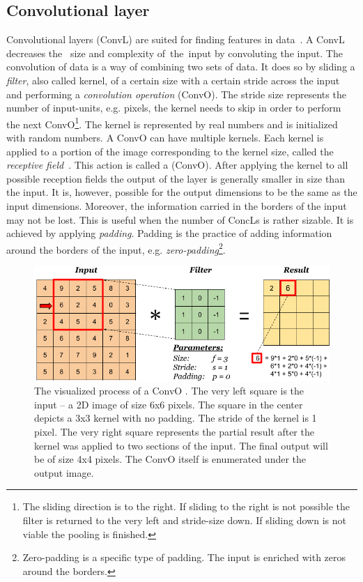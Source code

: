\subsection{Convolutional layer}\label{convolutionalLayers}
Convolutional layers (ConvL) are suited for finding features in data~\cite{CNN}. A ConvL decreases the~ size and complexity of~the~input by convoluting the input. The convolution of data is a way of combining two sets of data.  It does so by sliding a \textit{filter}, also called kernel, of a certain size with a certain stride across the input and performing a \textit{convolution operation} (ConvO). The stride size represents the number of input-units, e.g. pixels, the kernel needs to skip in order to perform the next ConvO\footnote{The sliding direction is to the right. If sliding to the right is not possible the filter is returned to the very left and stride-size down. If sliding down is not viable the pooling is finished.}. The kernel is represented by real numbers and is initialized with random numbers. A ConvO can have multiple kernels. Each kernel is applied to a portion of the image corresponding to the kernel size, called the \textit{receptive field}~\cite{receptiveField}. This action is called a (ConvO). After applying the kernel to all possible reception fields the output of the layer is generally smaller in size than the input. It is, however, possible for the output dimensions to be the same as the input dimensions. Moreover, the information carried in the borders of the input may not be lost. This is useful when the number of ConcLs is rather sizable. It is achieved by applying \textit{padding}. Padding is the practice of adding information around the borders of the input, e.g. \textit{zero-padding}\footnote{Zero-padding is a specific type of padding. The input is enriched with zeros around the borders.}.
\begin{figure}[ht!]
  \centering
  \includegraphics[width=\textwidth]{Images/convolution-operation.png}
  \caption{The visualized process of a ConvO \cite{convolutionOperationVisualization}. The very left square is the input -- a 2D image of size 6x6 pixels. The square in the center depicts a 3x3 kernel with no padding. The stride of the kernel is 1 pixel. The very right square represents the partial result after the kernel was applied to two sections of the input. The final output will be of size 4x4 pixels. The ConvO itself is enumerated under the output image.} 
  \label{convolutionalLayerVisualization}
\end{figure} 

